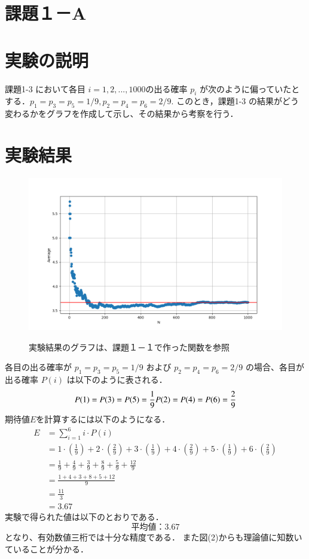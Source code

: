 \documentclass[fleqn, a4paper. 12pt]{ltjsarticle} %
\begin{document}
\section*{課題１－A}
\section*{実験の説明}
課題1-3 において各目 $i=1,2,...,1000  $の出る確率 $p_i$ が次のように偏っていたとする．$p_1 = p_3 =
p_5 = 1/9, p_2 = p_4 = p_6 = 2/9$. このとき，課題1-3 の結果がどう変わるかをグラフを作成して示し、その結果から考察を行う．
\section*{実験結果}
\begin{figure}[tb]
  \centering
  \includegraphics[width=\textwidth]{my_plot1-A.png}
  \label{f2}
  \caption{実験結果のグラフは、課題１－１で作った関数を参照}
\end{figure}

各目の出る確率が $p_1 = p_3 = p_5 = 1/9$ および $p_2 = p_4 = p_6 = 2/9$ の場合、各目が出る確率 $P(i)$ は以下のように表される．
\begin{equation}
  P(1) = P(3) = P(5) = \frac{1}{9}\\
  P(2) = P(4) = P(6) = \frac{2}{9}
\end{equation}
期待値$E$を計算するには以下のようになる．
\begin{align*}
  E &= \sum_{i=1}^{6} i \cdot P(i) \\[8pt]
  &= 1 \cdot \left(\frac{1}{9}\right) + 2 \cdot \left(\frac{2}{9}\right) + 3 \cdot \left(\frac{1}{9}\right) + 4 \cdot \left(\frac{2}{9}\right) + 5 \cdot \left(\frac{1}{9}\right) + 6 \cdot \left(\frac{2}{9}\right) \\[8pt]
  &= \frac{1}{9} + \frac{4}{9} + \frac{3}{9} + \frac{8}{9} + \frac{5}{9} + \frac{12}{9} \\[8pt]
  &= \frac{1 + 4 + 3 + 8 + 5 + 12}{9} \\[8pt]
  &= \frac{11}{3} \\[8pt]
  &= 3.67
\end{align*}
実験で得られた値は以下のとおりである．
\begin{equation}
  平均値：3.67
\end{equation}
となり、有効数値三桁では十分な精度である．
また図(2)からも理論値に知数いていることが分かる．
\end{document}
